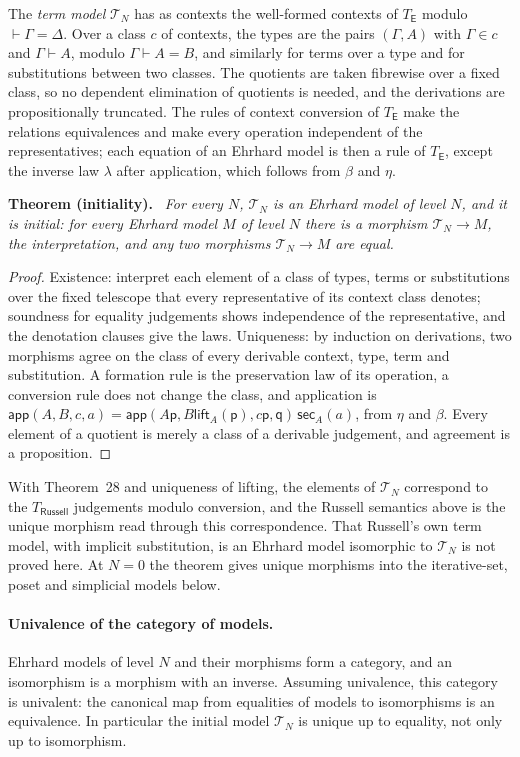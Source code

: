 \documentclass[11pt]{article}
\newenvironment{theorem}[1]{\par\medskip\noindent\textbf{Theorem #1.}\ \itshape}{\par\medskip}
\theoremstyle{definition}
\theoremstyle{remark}
\newcommand{\p}{\mathsf p}
\newcommand{\q}{\mathsf q}
\newcommand{\lift}{\mathsf{lift}}
\newcommand{\sect}{\mathsf{sec}}
\newcommand{\app}{\mathsf{app}}
\begin{document}
The \emph{term model} $\mathcal T_N$ has as contexts the well-formed
contexts of $T_{\mathsf E}$ modulo $\vdash\Gamma=\Delta$. Over a class $c$ of
contexts, the types are the pairs $(\Gamma,A)$ with $\Gamma\in c$ and
$\Gamma\vdash A$, modulo $\Gamma\vdash A=B$, and similarly for terms over a
type and for substitutions between two classes. The quotients are taken
fibrewise over a fixed class, so no dependent elimination of quotients is
needed, and the derivations are propositionally truncated. The rules of
context conversion of $T_{\mathsf E}$ make the relations equivalences and
make every operation independent of the representatives; each equation of
an Ehrhard model is then a rule of $T_{\mathsf E}$, except the inverse law
$\lambda$ after application, which follows from $\beta$ and $\eta$.

\begin{theorem}{(initiality)}
For every $N$, $\mathcal T_N$ is an Ehrhard model of level $N$, and it is
initial: for every Ehrhard model $M$ of level $N$ there is a morphism
$\mathcal T_N\to M$, the interpretation, and any two morphisms
$\mathcal T_N\to M$ are equal.
\end{theorem}
\begin{proof}
Existence: interpret each element of a class of types, terms or
substitutions over the fixed telescope that every representative of its
context class denotes; soundness for equality judgements shows independence
of the representative, and the denotation clauses give the laws. Uniqueness:
by induction on derivations, two morphisms agree on the class of every
derivable context, type, term and substitution. A formation rule is the
preservation law of its operation, a conversion rule does not change the
class, and application is $\app(A,B,c,a)=\app(A\p,B\lift_A(\p),c\p,\q)\,\sect_A(a)$,
from $\eta$ and $\beta$. Every element of a quotient is merely a class of a
derivable judgement, and agreement is a proposition.
\end{proof}

With Theorem~28 and uniqueness of lifting, the elements of $\mathcal T_N$
correspond to the $T_{\mathsf{Russell}}$ judgements modulo conversion, and
the Russell semantics above is the unique morphism read through this
correspondence. That Russell's own term model, with implicit substitution,
is an Ehrhard model isomorphic to $\mathcal T_N$ is not proved here. At
$N=0$ the theorem gives unique morphisms into the iterative-set, poset and
simplicial models below.

\paragraph{Univalence of the category of models.} Ehrhard models of level
$N$ and their morphisms form a category, and an isomorphism is a morphism
with an inverse. Assuming univalence, this category is univalent: the
canonical map from equalities of models to isomorphisms is an equivalence.
In particular the initial model $\mathcal T_N$ is unique up to equality, not
only up to isomorphism.
\end{document}
